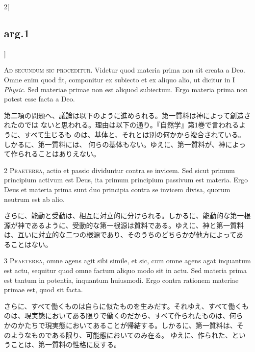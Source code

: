 \documentclass[paper=a4paper,fontsize=10pt,jafontsize=9pt,titlepage]{jlreq}
\begin{document}
\begin{paracol}{2}[\subsection{arg.1}]

{\scshape Ad secundum sic proceditur}. Videtur quod materia prima non sit creata a
Deo. Omne enim quod fit, componitur ex subiecto et ex aliquo alio, ut
dicitur in I {\itshape Physic}. Sed materiae primae non est aliquod subiectum. Ergo
materia prima non potest esse facta a Deo.

\switchcolumn

第二項の問題へ、議論は以下のように進められる。第一質料は神によって創造されたのでは
ないと思われる。理由は以下の通り。『自然学』第1巻で言われるように、すべて生じるも
のは、基体と、それとは別の何かから複合されている。しかるに、第一質料には、
何らの基体もない。ゆえに、第一質料が、神によって作られることはありえない。


2 {\scshape Praeterea}, actio et passio dividuntur contra se invicem. Sed
sicut primum principium activum est Deus, ita primum principium passivum
est materia. Ergo Deus et materia prima sunt duo principia contra se
invicem divisa, quorum neutrum est ab alio.

\switchcolumn

さらに、能動と受動は、相互に対立的に分けられる。しかるに、能動的な第一根
 源が神であるように、受動的な第一根源は質料である。ゆえに、神と第一質料
 は、互いに対立的な二つの根源であり、そのうちのどちらかが他方によってあ
 ることはない。


3 {\scshape Praeterea}, omne agens agit sibi simile, et sic, cum omne agens
 agat inquantum est actu, sequitur quod omne factum aliquo modo sit in
 actu. Sed materia prima est tantum in potentia, inquantum
 huiusmodi. Ergo contra rationem materiae primae est, quod sit facta.

\switchcolumn

さらに、すべて働くものは自らに似たものを生みだす。それゆえ、すべて働くも
 のは、現実態においてある限りで働くのだから、すべて作られたものは、何ら
 かのかたちで現実態においてあることが帰結する。しかるに、第一質料は、そ
 のようなものである限り、可能態においてのみ在る。
 ゆえに、作られた、ということは、第一質料の性格に反する。


\end{paracol}
\end{document}
